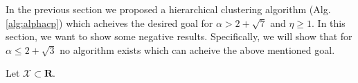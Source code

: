 \documentclass[11pt]{article}
\newcommand{\mc}{\mathcal}
\begin{document}
In the previous section we proposed a hierarchical clustering algorithm (Alg.\ref{alg:alphacp}) which acheives the desired goal for $\alpha > 2 + \sqrt{7}$ and $\eta \ge 1$. In this section, we want to show some negative results. Specifically, we will show that for $\alpha \le 2 + \sqrt{3}$ no algorithm exists which can acheive the above mentioned goal.

\begin{theorem}
Let $\mc X \subset \mathbf{R}$. 
\end{theorem}

\end{document}
